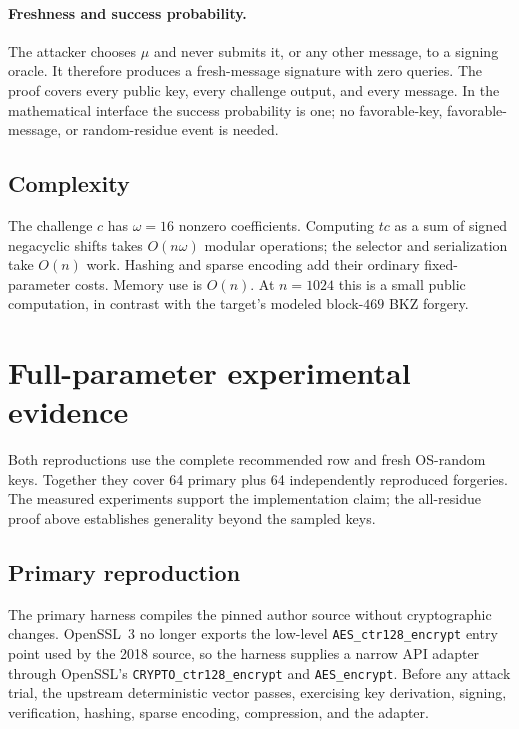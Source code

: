 \documentclass[10pt,a4paper]{article}
\begin{document}
\paragraph{Freshness and success probability.}
The attacker chooses $\mu$ and never submits it, or any other message, to a
signing oracle.  It therefore produces a fresh-message signature with zero
queries.  The proof covers every public key, every challenge output, and
every message.  In the mathematical interface the success probability is
one; no favorable-key, favorable-message, or random-residue event is needed.

\subsection{Complexity}

The challenge $c$ has $\omega=16$ nonzero coefficients.  Computing $tc$ as
a sum of signed negacyclic shifts takes $O(n\omega)$ modular operations; the
selector and serialization take $O(n)$ work.  Hashing and sparse encoding
add their ordinary fixed-parameter costs.  Memory use is $O(n)$.  At
$n=1024$ this is a small public computation, in contrast with the target's
modeled block-$469$ BKZ forgery.

\section{Full-parameter experimental evidence}

Both reproductions use the complete recommended row and fresh OS-random
keys.  Together they cover 64 primary plus 64 independently reproduced
forgeries.  The measured experiments support the implementation claim; the
all-residue proof above establishes generality beyond the sampled keys.

\subsection{Primary reproduction}

The primary harness compiles the pinned author source without cryptographic
changes.  OpenSSL~3 no longer exports the low-level
\texttt{AES\_ctr128\_encrypt} entry point used by the 2018 source, so the
harness supplies a narrow API adapter through OpenSSL's
\texttt{CRYPTO\_ctr128\_encrypt} and \texttt{AES\_encrypt}.  Before any
attack trial, the upstream deterministic vector passes, exercising key
derivation, signing, verification, hashing, sparse encoding, compression,
and the adapter.
\end{document}
